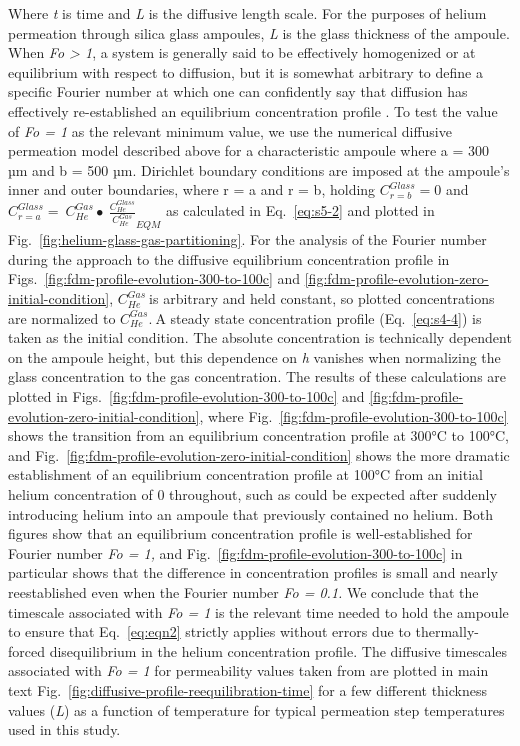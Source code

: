 Where \emph{t} is time and \emph{L} is the diffusive length scale. For
the purposes of helium permeation through silica glass ampoules,
\emph{L} is the glass thickness of the ampoule. When \emph{Fo
\textgreater{} 1}, a system is generally said to be effectively
homogenized or at equilibrium with respect to diffusion, but it is
somewhat arbitrary to define a specific Fourier number at which one can
confidently say that diffusion has effectively re-established an
equilibrium concentration profile \citep{ostrogorskyglicksman2015}. To
test the value of \emph{Fo = 1} as the relevant minimum value, we use the
numerical diffusive permeation model described above for a
characteristic ampoule where a = 300 µm and b = 500 µm. Dirichlet
boundary conditions are imposed at the ampoule's inner and outer
boundaries, where r = a and r = b, holding \(C_{r = b}^{Glass} = 0\) and
\(C_{r = a}^{Glass} = {\ C_{He}^{Gas} \bullet \ \frac{C_{He}^{Glass}}{C_{He}^{Gas}}}_{EQM}\) as
calculated in Eq.~\eqref{eq:s5-2} and plotted in Fig.~\ref{fig:helium-glass-gas-partitioning}. For the analysis of the
Fourier number during the approach to the diffusive equilibrium
concentration profile in Figs.~\ref{fig:fdm-profile-evolution-300-to-100c} and \ref{fig:fdm-profile-evolution-zero-initial-condition}, \(C_{He}^{Gas}\ \)is
arbitrary and held constant, so plotted concentrations are normalized to
\(C_{He}^{Gas}.\ \)A steady state concentration profile (Eq.~\eqref{eq:s4-4}) is
taken as the initial condition. The absolute concentration is
technically dependent on the ampoule height, but this dependence on
\emph{h} vanishes when normalizing the glass concentration to the gas
concentration. The results of these calculations are plotted in Figs.~\ref{fig:fdm-profile-evolution-300-to-100c}
and \ref{fig:fdm-profile-evolution-zero-initial-condition}, where Fig.~\ref{fig:fdm-profile-evolution-300-to-100c} shows the transition from an equilibrium
concentration profile at 300°C to 100°C, and Fig.~\ref{fig:fdm-profile-evolution-zero-initial-condition} shows the more
dramatic establishment of an equilibrium concentration profile at 100°C
from an initial helium concentration of 0 throughout, such as could be
expected after suddenly introducing helium into an ampoule that
previously contained no helium. Both figures show that an equilibrium
concentration profile is well-established for Fourier number \emph{Fo =
1,} and Fig.~\ref{fig:fdm-profile-evolution-300-to-100c} in particular shows that the difference in concentration
profiles is small and nearly reestablished even when the Fourier number
\emph{Fo = 0.1.} We conclude that the timescale associated with \emph{Fo
= 1} is the relevant time needed to hold the ampoule to ensure that Eq.~\eqref{eq:eqn2}
strictly applies without errors due to thermally-forced disequilibrium
in the helium concentration profile. The diffusive timescales associated
with \emph{Fo = 1} for permeability values taken from \citet{swets1961}
are plotted in main text Fig.~\ref{fig:diffusive-profile-reequilibration-time} for a few different thickness values (\emph{L}) as a
function of temperature for typical permeation step temperatures used in
this study.

